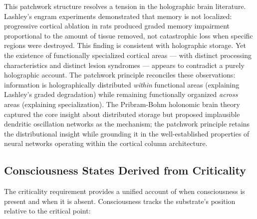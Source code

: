 \documentclass[12pt]{article}
\begin{document}
This patchwork structure resolves a tension in the holographic brain literature. Lashley's engram experiments \citep{Lashley1950} demonstrated that memory is not localized: progressive cortical ablation in rats produced graded memory impairment proportional to the amount of tissue removed, not catastrophic loss when specific regions were destroyed. This finding is consistent with holographic storage. Yet the existence of functionally specialized cortical areas \citep{Brodmann1909} --- with distinct processing characteristics and distinct lesion syndromes --- appears to contradict a purely holographic account. The patchwork principle reconciles these observations: information is holographically distributed \emph{within} functional areas (explaining Lashley's graded degradation) while remaining functionally organized \emph{across} areas (explaining specialization). The Pribram-Bohm holonomic brain theory \citep{Pribram1991} captured the core insight about distributed storage but proposed implausible dendritic oscillation networks as the mechanism; the patchwork principle retains the distributional insight while grounding it in the well-established properties of neural networks operating within the cortical column architecture.


\subsection{Consciousness States Derived from Criticality}


The criticality requirement provides a unified account of when consciousness is present and when it is absent. Consciousness tracks the substrate's position relative to the critical point:
\end{document}
